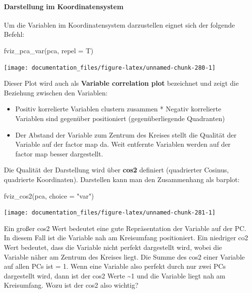 \documentclass[
]{article}
\newenvironment{Shaded}{\begin{snugshade}}{\end{snugshade}}
\newcommand{\AttributeTok}[1]{\textcolor[rgb]{0.77,0.63,0.00}{#1}}
\newcommand{\FunctionTok}[1]{\textcolor[rgb]{0.00,0.00,0.00}{#1}}
\newcommand{\NormalTok}[1]{#1}
\newcommand{\StringTok}[1]{\textcolor[rgb]{0.31,0.60,0.02}{#1}}
\providecommand{\tightlist}{%
  \setlength{\itemsep}{0pt}\setlength{\parskip}{0pt}}
\begin{document}
\hypertarget{darstellung-im-koordinatensystem}{%
\paragraph{Darstellung im Koordinatensystem}\label{darstellung-im-koordinatensystem}}

Um die Variablen im Koordinatensystem darzustellen eignet sich der folgende Befehl:

\begin{Shaded}
\begin{Highlighting}[]
\FunctionTok{fviz\_pca\_var}\NormalTok{(pca, }\AttributeTok{repel =}\NormalTok{ T)}
\end{Highlighting}
\end{Shaded}

\begin{center}\texttt{[image: documentation\_files/figure-latex/unnamed-chunk-280-1]} \end{center}

Dieser Plot wird auch als \textbf{Variable correlation plot} bezeichnet und zeigt die Beziehung zwischen den Variablen:

\begin{itemize}
\tightlist
\item
  Positiv korrelierte Variablen clustern zusammen * Negativ korrelierte Variablen sind gegenüber positioniert (gegenüberliegende Quadranten)
\item
  Der Abstand der Variable zum Zentrum des Kreises stellt die Qualität der Variable auf der factor map da. Weit entfernte Variablen werden auf der factor map besser dargestellt.
\end{itemize}

Die Qualität der Darstellung wird über \textbf{cos2} definiert (quadrierter Cosinus, quadrierte Koordinaten). Darstellen kann man den Zusammenhang als barplot:

\begin{Shaded}
\begin{Highlighting}[]
\FunctionTok{fviz\_cos2}\NormalTok{(pca, }\AttributeTok{choice =} \StringTok{"var"}\NormalTok{)}
\end{Highlighting}
\end{Shaded}

\begin{center}\texttt{[image: documentation\_files/figure-latex/unnamed-chunk-281-1]} \end{center}

Ein großer cos2 Wert bedeutet eine gute Repräsentation der Variable auf der PC. In diesem Fall ist die Variable nah am Kreisumfang positioniert.
Ein niedriger co2 Wert bedeutet, dass die Variable nicht perfekt dargestellt wird, wobei die Variable näher am Zentrum des Kreises liegt. Die Summe des cos2 einer Variable auf allen PCs ist = 1.
Wenn eine Variable also perfekt durch nur zwei PCs dargestellt wird, dann ist der cos2 Werte \textasciitilde1 und die Variable liegt nah am Kreisumfang. Wozu ist der cos2 also wichtig?
\end{document}

